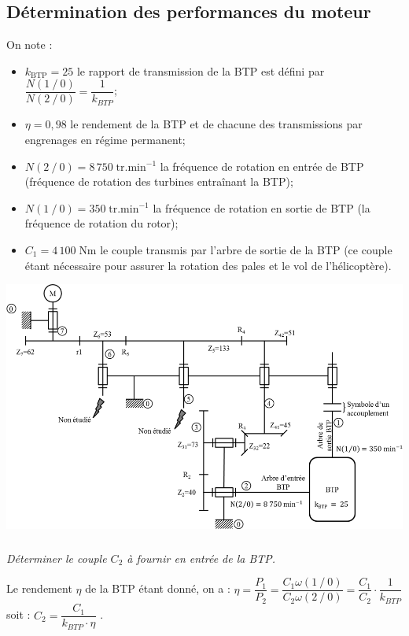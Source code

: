 \documentclass[10pt,fleqn]{article} %
\begin{document}
\begin{multicols}{2}
\subsection*{Détermination des performances du moteur}
On note :
\begin{itemize}
\item $k_{\text{BTP}}=25$  le rapport de transmission de la BTP est défini par $\dfrac{N(1⁄0)}{N(2⁄0)} =\dfrac{1}{k_{BTP}}$;
\item $\eta =0,98$  le rendement de la BTP et de chacune des transmissions par engrenages en régime permanent;
\item $N(2⁄0)=8\,750 \;\text{tr.min}^{-1}$ la fréquence de rotation en entrée de BTP (fréquence de rotation des turbines entraînant la BTP);
\item $N(1⁄0)=350\;\text{tr.min}^{-1}$ la fréquence de rotation en sortie de BTP (la fréquence de rotation du rotor);
\item $C_1=4\,100 \;\text{Nm}$ le couple transmis par l’arbre de sortie de la BTP (ce couple étant nécessaire pour assurer la rotation des pales et le vol de l’hélicoptère).
\end{itemize}

\begin{center}
\includegraphics[width=.95\linewidth]{images/schema}
\end{center}
\subparagraph{}
\textit{Déterminer le couple $C_2$ à fournir en entrée de la BTP.} 
\ifprof

\begin{corrige}

Le rendement $\eta$ de la BTP étant donné, on a : 
$\eta =\dfrac{P_1}{P_2} =\dfrac{C_1 \omega (1⁄0)}{C_2 \omega (2⁄0)} = \dfrac{C_1}{C_2} \cdot \dfrac{1}{k_{BTP}}$ 	soit :	$C_2=\dfrac{C_1}{k_{BTP}\cdot \eta }$ .


\end{corrige}
\end{multicols}
\end{document}
